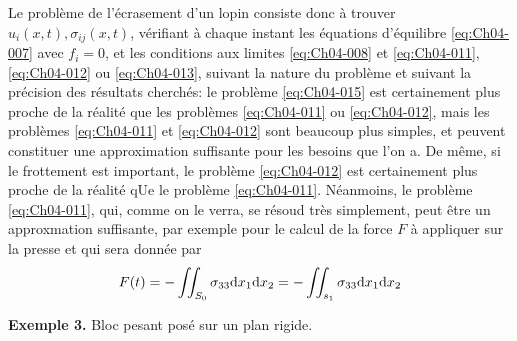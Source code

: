 Le problème de l'écrasement d'un lopin consiste donc à trouver $u_i(x,t), \sigma_{ij}(x,t)$, vérifiant à chaque instant les équations d'équilibre \eqref{eq:Ch04-007} avec $f_i = 0$, et les conditions aux limites \eqref{eq:Ch04-008} et \eqref{eq:Ch04-011}, \eqref{eq:Ch04-012} ou \eqref{eq:Ch04-013}, suivant la nature du problème et suivant la précision des résultats cherchés: le problème \eqref{eq:Ch04-015} est certainement plus proche de la réalité que les problèmes \eqref{eq:Ch04-011} ou \eqref{eq:Ch04-012}, mais les problèmes \eqref{eq:Ch04-011} et \eqref{eq:Ch04-012} sont beaucoup plus simples, et peuvent constituer une approximation suffisante pour les besoins que l'on a.
De même, si le frottement est important, le problème \eqref{eq:Ch04-012} est certainement plus proche de la réalité qUe le problème \eqref{eq:Ch04-011}.
Néanmoins, le problème \eqref{eq:Ch04-011}, qui, comme on le verra, se résoud très simplement, peut être un approxmation suffisante, par exemple pour le calcul de la force $F$ à appliquer sur la presse et qui sera donnée par
\begin{equation}
    F(t) = - \iint_{S_0} \sigma_{33} \mathrm{d} x_1 \mathrm{d} x_2 = - \iint_{s_1} \sigma_{33} \mathrm{d} x_1 \mathrm{d} x_2
    \label{eq:Ch04-016}
\end{equation}

\textbf{Exemple 3.} Bloc pesant posé sur un plan rigide.

